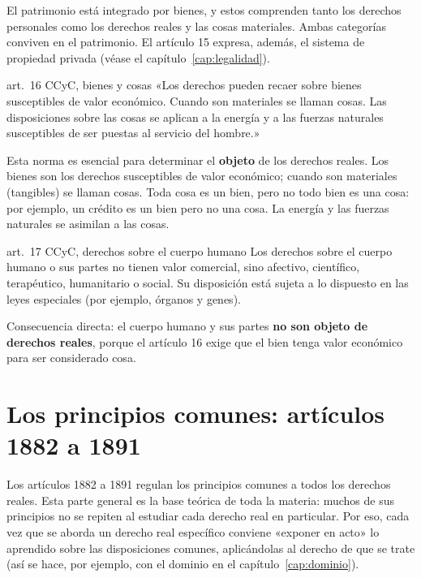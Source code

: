\documentclass[12pt,oneside]{book}
\begin{document}
El patrimonio está integrado por bienes, y estos comprenden tanto los derechos personales como los derechos reales y las cosas materiales. Ambas categorías conviven en el patrimonio. El artículo 15 expresa, además, el sistema de propiedad privada (véase el capítulo~\ref{cap:legalidad}).

\begin{regla}{art.~16 CCyC, bienes y cosas}
«Los derechos pueden recaer sobre bienes susceptibles de valor económico. Cuando son materiales se llaman cosas. Las disposiciones sobre las cosas se aplican a la energía y a las fuerzas naturales susceptibles de ser puestas al servicio del hombre.»
\end{regla}

Esta norma es esencial para determinar el \textbf{objeto} de los derechos reales. Los bienes son los derechos susceptibles de valor económico; cuando son materiales (tangibles) se llaman cosas. Toda cosa es un bien, pero no todo bien es una cosa: por ejemplo, un crédito es un bien pero no una cosa. La energía y las fuerzas naturales se asimilan a las cosas.

\begin{regla}{art.~17 CCyC, derechos sobre el cuerpo humano}
Los derechos sobre el cuerpo humano o sus partes no tienen valor comercial, sino afectivo, científico, terapéutico, humanitario o social. Su disposición está sujeta a lo dispuesto en las leyes especiales (por ejemplo, órganos y genes).
\end{regla}

Consecuencia directa: el cuerpo humano y sus partes \textbf{no son objeto de derechos reales}, porque el artículo 16 exige que el bien tenga valor económico para ser considerado cosa.

\section{Los principios comunes: artículos 1882 a 1891}

Los artículos 1882 a 1891 regulan los principios comunes a todos los derechos reales. Esta parte general es la base teórica de toda la materia: muchos de sus principios no se repiten al estudiar cada derecho real en particular. Por eso, cada vez que se aborda un derecho real específico conviene «exponer en acto» lo aprendido sobre las disposiciones comunes, aplicándolas al derecho de que se trate (así se hace, por ejemplo, con el dominio en el capítulo~\ref{cap:dominio}).
\end{document}
